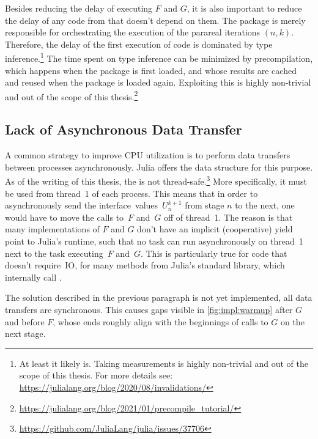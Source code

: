 Besides reducing the delay of executing $F$ and $G$,
it is also important to reduce the delay of any code from  that doesn't depend on them.
The package is merely responsible for orchestrating the execution of the parareal iterations $(n,k)$.
Therefore, the delay of the first execution of  code is dominated by type inference.\footnote{%
  At least it likely is. Taking measurements is highly non-trivial and out of the scope of this thesis.
  For more details see: \url{https://julialang.org/blog/2020/08/invalidations/}
}
The time spent on type inference can be minimized by precompilation,
which happens when the package is first loaded,
and whose results are cached and reused when the package is loaded again.
Exploiting this is highly non-trivial and out of the scope of this thesis.\footnote{\url{https://julialang.org/blog/2021/01/precompile_tutorial/}}


\subsection{Lack of Asynchronous Data Transfer}

A common strategy to improve CPU utilization is to perform data transfers between processes asynchronously.
Julia offers the  data structure for this purpose.
As of the writing of this thesis,
the  is not thread-safe.\footnote{\url{https://github.com/JuliaLang/julia/issues/37706}}
More specifically, it must be used from thread~1 of each process.
This means that in order to asynchronously send the interface~values~$U_n^{k+1}$ from stage $n$ to the next,
one would have to move the calls to~$F$ and~$G$ off of thread~1.
The reason is that many implementations of $F$ and $G$ don't have an implicit (cooperative) yield point to Julia's runtime,
such that no task can run asynchronously on thread~1 next to the task executing~$F$ and~$G$.
This is particularly true for code that doesn't require~\ac{IO},
\eg for many methods from Julia's  standard library,
which internally call .

The solution described in the previous paragraph is not yet implemented,
\ie all data transfers are synchronous.
This causes gaps visible in \autoref{fig:impl:warmup} after $G$ and before $F$,
whose ends roughly align with the beginnings of calls to $G$ on the next stage.

